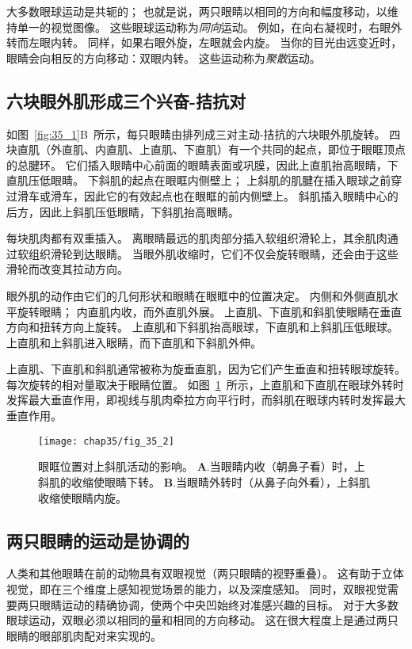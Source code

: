 大多数眼球运动是共轭的；
也就是说，两只眼睛以相同的方向和幅度移动，以维持单一的视觉图像。
这些眼球运动称为\textit{同向}运动。
例如，在向右凝视时，右眼外转而左眼内转。
同样，如果右眼外旋，左眼就会内旋。
当你的目光由远变近时，眼睛会向相反的方向移动：双眼内转。
这些运动称为\textit{聚散}运动。



\subsection{六块眼外肌形成三个兴奋-拮抗对}

如图~\ref{fig:35_1}B~所示，每只眼睛由排列成三对主动-拮抗的六块眼外肌旋转。
四块直肌（外直肌、内直肌、上直肌、下直肌）有一个共同的起点，即位于眼眶顶点的总腱环。
它们插入眼睛中心前面的眼睛表面或巩膜，因此上直肌抬高眼睛，下直肌压低眼睛。
下斜肌的起点在眼眶内侧壁上；
上斜肌的肌腱在插入眼球之前穿过滑车或滑车，因此它的有效起点也在眼眶的前内侧壁上。
斜肌插入眼睛中心的后方，因此上斜肌压低眼睛，下斜肌抬高眼睛。


每块肌肉都有双重插入。
离眼睛最远的肌肉部分插入软组织滑轮上，其余肌肉通过软组织滑轮到达眼睛。
当眼外肌收缩时，它们不仅会旋转眼睛，还会由于这些滑轮而改变其拉动方向。


眼外肌的动作由它们的几何形状和眼睛在眼眶中的位置决定。
内侧和外侧直肌水平旋转眼睛；
内直肌内收，而外直肌外展。
上直肌、下直肌和斜肌使眼睛在垂直方向和扭转方向上旋转。
上直肌和下斜肌抬高眼球，下直肌和上斜肌压低眼球。
上直肌和上斜肌进入眼睛，而下直肌和下斜肌外伸。


上直肌、下直肌和斜肌通常被称为旋垂直肌，因为它们产生垂直和扭转眼球旋转。
每次旋转的相对量取决于眼睛位置。
如图~\ref{fig:35_2}~所示，上直肌和下直肌在眼球外转时发挥最大垂直作用，即视线与肌肉牵拉方向平行时，而斜肌在眼球内转时发挥最大垂直作用。


\begin{figure}[htbp]
	\centering
	\texttt{[image: chap35/fig\_35\_2]}
	\caption{眼眶位置对上斜肌活动的影响。
		\textbf{A}.当眼睛内收（朝鼻子看）时，上斜肌的收缩使眼睛下转。
		\textbf{B}.当眼睛外转时（从鼻子向外看），上斜肌收缩使眼睛内旋。}
	\label{fig:35_2}
\end{figure}



\subsection{两只眼睛的运动是协调的}

人类和其他眼睛在前的动物具有双眼视觉（两只眼睛的视野重叠）。
这有助于立体视觉，即在三个维度上感知视觉场景的能力，以及深度感知。
同时，双眼视觉需要两只眼睛运动的精确协调，使两个中央凹始终对准感兴趣的目标。
对于大多数眼球运动，双眼必须以相同的量和相同的方向移动。 
这在很大程度上是通过两只眼睛的眼部肌肉配对来实现的。


